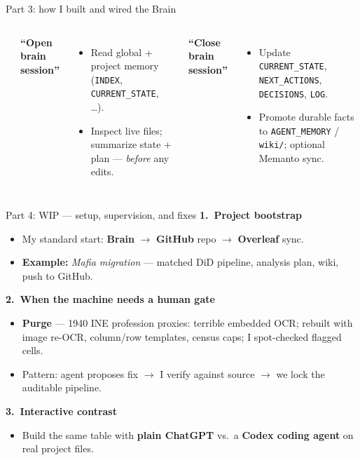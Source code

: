 \begin{frame}[t]{Part 3: how I built and wired the Brain}
\begin{columns}[T,onlytextwidth]
\begin{itemize}
      \end{itemize}
      \textbf{``Open brain session''}
      \begin{itemize}\setlength\itemsep{0.06em}
        \item Read global + project memory (\texttt{INDEX}, \texttt{CURRENT\_STATE}, \ldots).
        \item Inspect live files; summarize state + plan --- \emph{before} any edits.
      \end{itemize}
      \textbf{``Close brain session''}
      \begin{itemize}\setlength\itemsep{0.06em}
        \item Update \texttt{CURRENT\_STATE}, \texttt{NEXT\_ACTIONS}, \texttt{DECISIONS}, \texttt{LOG}.
        \item Promote durable facts to \texttt{AGENT\_MEMORY} / \texttt{wiki/}; optional Memanto sync.
      \end{itemize}
  \end{columns}
\end{frame}



\begin{frame}{Part 4: WIP --- setup, supervision, and fixes}
  \small
  \textbf{1.\ Project bootstrap}
  \begin{itemize}\setlength\itemsep{0.28em}
    \item My standard start: \textbf{Brain} $\rightarrow$ \textbf{GitHub} repo $\rightarrow$ \textbf{Overleaf} sync.
    \item \textbf{Example:} \emph{Mafia migration} --- matched DiD pipeline, analysis plan, wiki, push to GitHub.
  \end{itemize}
  \vspace{0.25cm}
  \textbf{2.\ When the machine needs a human gate}
  \begin{itemize}\setlength\itemsep{0.28em}
    \item \textbf{Purge} --- 1940 INE profession proxies: terrible embedded OCR; rebuilt with image re-OCR, column/row templates, census caps; I spot-checked flagged cells.
    \item Pattern: agent proposes fix $\rightarrow$ I verify against source $\rightarrow$ we lock the auditable pipeline.
  \end{itemize}
  \vspace{0.25cm}
  \textbf{3.\ Interactive contrast}
  \begin{itemize}\setlength\itemsep{0.28em}
    \item Build the same table with \textbf{plain ChatGPT} vs.\ a \textbf{Codex coding agent} on real project files.
  \end{itemize}
  \vspace{0.15cm}
  \begin{center}\end{center}
\end{frame}
